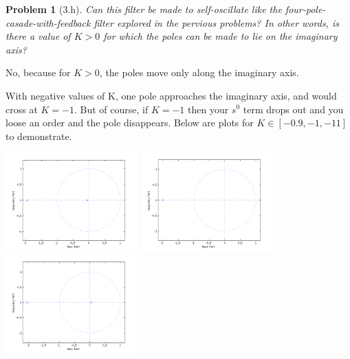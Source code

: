 \documentclass[12pt]{article}
\newtheorem*{prob}{Problem}
\begin{document}
\begin{prob}[3.h]{
Can this filter be made to self-oscillate like the four-pole-casade-with-feedback filter explored in the pervious problems? In other words, is there a value of $K > 0$ for which the poles can be made to lie on the imaginary axis?
}\end{prob}

No, because for $K>0$, the poles move only along the imaginary axis.

With negative values of K, one pole approaches the imaginary axis, and would cross at $K=-1$. But of course, if $K=-1$ then your $s^0$ term drops out and you loose an order and the pole disappears. Below are plots for $K \in [-0.9, -1, -11]$ to demonstrate.

\begin{center}
\includegraphics[width=2in]{k-09.png}
\includegraphics[width=2in]{k-1.png}
\includegraphics[width=2in]{k-11.png}
\end{center}

\end{document}
